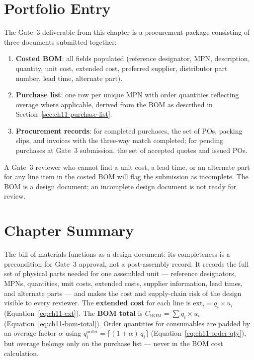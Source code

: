 \section*{Portfolio Entry}
\label{sec:ch11-artifact}

The Gate~3 deliverable from this chapter is a procurement package consisting
of three documents submitted together:

\begin{enumerate}
  \item[(a)] \textbf{Costed BOM}: all fields populated (reference designator,
        MPN, description, quantity, unit cost, extended cost, preferred
        supplier, distributor part number, lead time, alternate part).

  \item[(b)] \textbf{Purchase list}: one row per unique MPN with order
        quantities reflecting overage where applicable, derived from the BOM
        as described in Section~\ref{sec:ch11-purchase-list}.

  \item[(c)] \textbf{Procurement records}: for completed purchases, the set of
        POs, packing slips, and invoices with the three-way match completed;
        for pending purchases at Gate~3 submission, the set of accepted quotes
        and issued POs.
\end{enumerate}

A Gate~3 reviewer who cannot find a unit cost, a lead time, or an alternate
part for any line item in the costed BOM will flag the submission as incomplete.
The BOM is a design document; an incomplete design document is not ready for
review.

\section*{Chapter Summary}
\label{sec:ch11-summary}

The bill of materials functions as a design document: its completeness is a precondition for Gate~3 approval, not a post-assembly record.
It records the full set of physical parts needed for one assembled unit ---
reference designators, MPNs, quantities, unit costs, extended costs, supplier
information, lead times, and alternate parts --- and makes the cost and
supply-chain risk of the design visible to every reviewer.
The \textbf{extended cost} for each line is $\text{ext}_i = q_i \times u_i$
(Equation~\ref{eq:ch11-ext}).
The \textbf{BOM total} is $C_{\text{BOM}} = \sum q_i \times u_i$
(Equation~\ref{eq:ch11-bom-total}).
Order quantities for consumables are padded by an overage factor $\alpha$ using
$q_i^{\text{order}} = \lceil (1+\alpha)\,q_i \rceil$
(Equation~\ref{eq:ch11-order-qty}), but overage belongs only on the purchase
list --- never in the BOM cost calculation.

